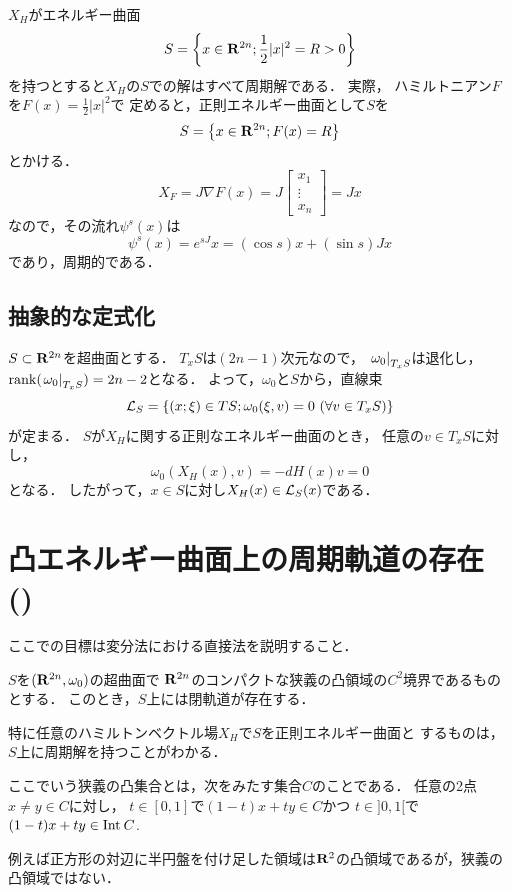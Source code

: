 \begin{EG*}
    \(X_H\)がエネルギー曲面\[
        S=\left\{x\in\rr^{2n}; 
        \frac{1}{2}\lvert x\rvert^2=R>0
        \right\}
    \]を持つとすると\(X_H\)の\(S\)での解はすべて周期解である．
    実際，
    ハミルトニアン\(F\)を\(F(x)= \frac{1}{2}\lvert x\rvert^2\)で
    定めると，正則エネルギー曲面として\(S\)を
    \[
        S=\left\{x\in\rr^{2n}; 
        F(x)=R
        \right\}
    \]とかける．
    \[
        X_F
        =J\nabla F(x)
        =J
        \begin{bmatrix}
            x_1\\
            \vdots\\
            x_n
        \end{bmatrix}
        =Jx
    \]
    なので，その流れ\(\psi^s(x)\)は
    \[
        \psi^s(x)=
        e^{sJ}x
        =(\cos{s})x+(\sin{s})Jx
    \]
    であり，周期的である．
\end{EG*}

\subsection*{抽象的な定式化}
\(S\subset \rr^{2n}\)を超曲面とする．
\(T_xS\)は\((2n-1)\)次元なので，
\(\mres[\omega_{0}]{T_{x}S}\)は退化し，
\(\rank(\mres[\omega_{0}]{T_{x}S})=2n-2\)となる．
よって，\(\omega_0\)と\(S\)から，直線束
\[
    \cL_S
    =
    \left\{
        (x;\xi)\in TS;
        \omega_0(\xi,v)=0\ (\forall v\in T_xS)
    \right\}
\]が定まる．
\(S\)が\(X_H\)に関する正則なエネルギー曲面のとき，
任意の\(v\in T_xS\)に対し，
\[
    \omega_0(X_{H}(x),v)=-dH(x)v=0
\]
となる．
したがって，\(x\in S\)に対し\(X_H(x)\in\cL_S(x)\)である．


\section{凸エネルギー曲面上の周期軌道の存在 (\cite[\S1.5]{HZ94})}

ここでの目標は変分法における直接法を説明すること．
\begin{leftbar}
\begin{THM}[{\cite[Thm 5]{HZ94}}]
    \(S\)を\((\rr^{2n},\omega_0)\)の超曲面で
    \(\rr^{2n}\)のコンパクトな狭義の凸領域の\(C^2\)境界であるものとする．
    このとき，\(S\)上には閉軌道が存在する．
\end{THM}
\end{leftbar}

特に任意のハミルトンベクトル場\(X_H\)で\(S\)を正則エネルギー曲面と
するものは，\(S\)上に周期解を持つことがわかる．
\begin{CMT}
    ここでいう狭義の凸集合とは，次をみたす集合\(C\)のことである．
    任意の2点\(x\ne y\in C\)に対し，
    \(t\in[0,1]\)で\((1-t)x+ty\in C\)かつ
    \(t\in{]0,1[}\)で\((1-t)x+ty\in\Int[]C\).

    例えば正方形の対辺に半円盤を付け足した領域は\(\rr^2\)の凸領域であるが，狭義の凸領域ではない．
\end{CMT}

